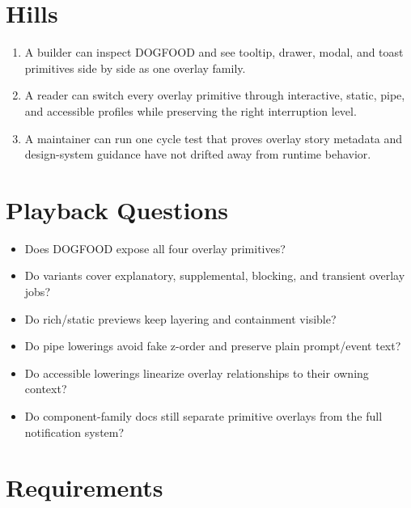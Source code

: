 \section{Hills}\label{record-102-hills}

\begin{enumerate}
\def\labelenumi{\arabic{enumi}.}
\tightlist
\item
  A builder can inspect DOGFOOD and see tooltip, drawer, modal, and toast primitives side by side as one overlay family.
\item
  A reader can switch every overlay primitive through interactive, static, pipe, and accessible profiles while preserving the right interruption level.
\item
  A maintainer can run one cycle test that proves overlay story metadata and design-system guidance have not drifted away from runtime behavior.
\end{enumerate}

\section{Playback Questions}\label{record-102-playback-questions}

\begin{itemize}
\tightlist
\item
  Does DOGFOOD expose all four overlay primitives?
\item
  Do variants cover explanatory, supplemental, blocking, and transient overlay jobs?
\item
  Do rich/static previews keep layering and containment visible?
\item
  Do pipe lowerings avoid fake z-order and preserve plain prompt/event text?
\item
  Do accessible lowerings linearize overlay relationships to their owning context?
\item
  Do component-family docs still separate primitive overlays from the full notification system?
\end{itemize}

\section{Requirements}\label{record-102-requirements}

